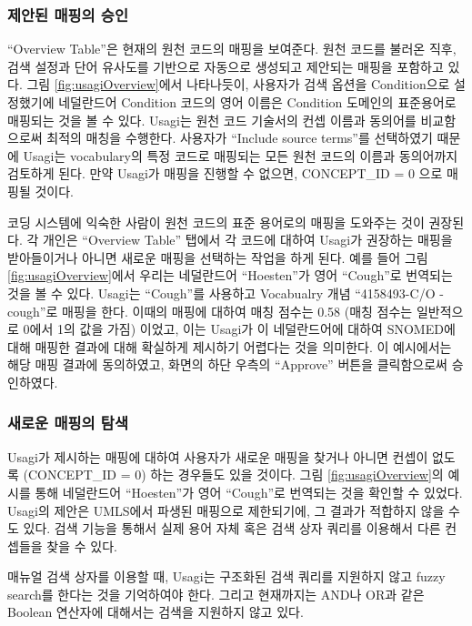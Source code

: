 \documentclass[11pt]{book}
\theoremstyle{definition}
\theoremstyle{definition}
\theoremstyle{definition}
\theoremstyle{remark}
\begin{document}
\subsubsection*{제안된 매핑의 승인}\label{--}

``Overview Table''은 현재의 원천 코드의 매핑을 보여준다. 원천 코드를
불러온 직후, 검색 설정과 단어 유사도를 기반으로 자동으로 생성되고
제안되는 매핑을 포함하고 있다. 그림 \ref{fig:usagiOverview}에서
나타나듯이, 사용자가 검색 옵션을 Condition으로 설정했기에 네덜란드어
Condition 코드의 영어 이름은 Condition 도메인의 표준용어로 매핑되는 것을
볼 수 있다. Usagi는 원천 코드 기술서의 컨셉 이름과 동의어를 비교함으로써
최적의 매칭을 수행한다. 사용자가 ``Include source terms''를 선택하였기
때문에 Usagi는 vocabulary의 특정 코드로 매핑되는 모든 원천 코드의 이름과
동의어까지 검토하게 된다. 만약 Usagi가 매핑을 진행할 수 없으면,
CONCEPT\_ID = 0 으로 매핑될 것이다.

코딩 시스템에 익숙한 사람이 원천 코드의 표준 용어로의 매핑을 도와주는
것이 권장된다. 각 개인은 ``Overview Table'' 탭에서 각 코드에 대하여
Usagi가 권장하는 매핑을 받아들이거나 아니면 새로운 매핑을 선택하는
작업을 하게 된다. 예를 들어 그림 \ref{fig:usagiOverview}에서 우리는
네덜란드어 ``Hoesten''가 영어 ``Cough''로 번역되는 것을 볼 수 있다.
Usagi는 ``Cough''를 사용하고 Vocabualry 개념 ``4158493-C/O - cough''로
매핑을 한다. 이때의 매핑에 대하여 매칭 점수는 0.58 (매칭 점수는
일반적으로 0에서 1의 값을 가짐) 이었고, 이는 Usagi가 이 네덜란드어에
대하여 SNOMED에 대해 매핑한 결과에 대해 확실하게 제시하기 어렵다는 것을
의미한다. 이 예시에서는 해당 매핑 결과에 동의하였고, 화면의 하단 우측의
``Approve'' 버튼을 클릭함으로써 승인하였다.

\subsubsection*{새로운 매핑의 탐색}\label{--}

Usagi가 제시하는 매핑에 대하여 사용자가 새로운 매핑을 찾거나 아니면
컨셉이 없도록 (CONCEPT\_ID = 0) 하는 경우들도 있을 것이다. 그림
\ref{fig:usagiOverview}의 예시를 통해 네덜란드어 ``Hoesten''가 영어
``Cough''로 번역되는 것을 확인할 수 있었다. Usagi의 제안은 UMLS에서
파생된 매핑으로 제한되기에, 그 결과가 적합하지 않을 수도 있다. 검색
기능을 통해서 실제 용어 자체 혹은 검색 상자 쿼리를 이용해서 다른
컨셉들을 찾을 수 있다.

매뉴얼 검색 상자를 이용할 때, Usagi는 구조화된 검색 쿼리를 지원하지 않고
fuzzy search를 한다는 것을 기억하여야 한다. 그리고 현재까지는 AND나 OR과
같은 Boolean 연산자에 대해서는 검색을 지원하지 않고 있다.
\end{document}
